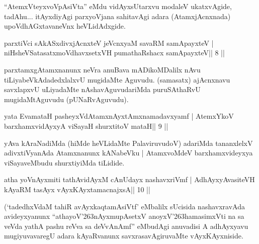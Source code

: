 \begin{artha}
``AtemxVteyxvoVpAsiVta'' eMdu vidAyxsUtarxvu modaleV ukatxvAgide, tadAhu... itAyxdiyAgi parxyoVjana sahitavAgi adara (AtamxjAcnxnada) upoVdhAGxtavaneVnx heVLidAdxgide.
\end{artha} 


\begin{shl}
parxtiVci sAkASxdivxjAcnxteV jeVcnxyaM savaRM samApayxteV |
niHsheVSatasatxmoVdhavxsetxVH pumathaRshacx samApayxteV\hfill || 8 ||
\end{shl}

\begin{artha}
parxtamxgAtamxnanunx neVra anuBava mADikoMDalilx nAvu tiLiyabeVkAdadedxlalxvU mugidaMte Aguvudu. (samasatx) ajAcnxnavu savxlapxvU uLiyadaMte nAshavAguvudariMda puruSAthaRvU mugidaMtAguvudu (pUNaRvAguvudu).
\end{artha}

\begin{shl}
yata EvamataH pasheyxVdAtamxnAyxtAmxnamadavxyamf |
AtemxYkoV barxhamxvidAyxyA viSayaH shurxtitoV mataH\hfill || 9 ||
\end{shl}

\begin{artha}
yAva kAraNadiMda (hiMde heVLidaMte PalaviruvudoV) adariMda tananxlelxV adivxtiVyanAda Atamxnanunx kANabeVku | AtamxvoMdeV barxhamxvideyxya viSayaveMbudu shurxtiyiMda tiLidide.
\end{artha} 



\begin{shl}
atha yoV\s nAyxmiti tathA\s vidAyxM cAnUdayx nashavxriVmf |
A\s dhAyxyAvasiteVH kAyaRM tasAyx vAyxKAyxtamacnajxsA\hfill || 10 ||
\end{shl}

\begin{artha}
(`tadedhxVdaM tahiR avAyxkaqtamAsiVtf' eMbalilx sUcisida nashavxravAda 
avideyxyanunx ``athayoV\char'263nAyxmupAsetxV anoyxV\char'263hamasimxVti na sa veVda yathA pashu reVva sa deVvAnAmf'' eMbudAgi anuvadisi A adhAyxyavu mugiyuvavaregU adara kAyaRvanunx savxrasavAgiruvaMte vAyxKAyxniside.
\end{artha} 


